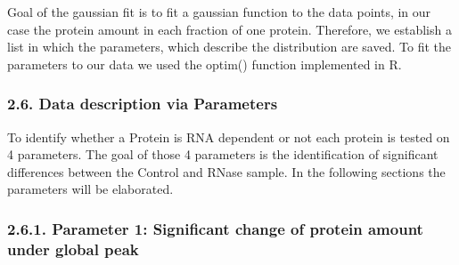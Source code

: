 \documentclass[
  12pt,
]{article}
\begin{document}
Goal of the gaussian fit is to fit a gaussian function to the data
points, in our case the protein amount in each fraction of one protein.
Therefore, we establish a list in which the parameters, which describe
the distribution are saved. To fit the parameters to our data we used
the optim() function implemented in R.

\hypertarget{data-description-via-parameters}{%
\subsubsection{2.6. Data description via
Parameters}\label{data-description-via-parameters}}

\renewcommand{\section}{\titlespacing*{\section}{0pt}{0.3\baselineskip}{0.2\baselineskip}\section}

To identify whether a Protein is RNA dependent or not each protein is
tested on 4 parameters. The goal of those 4 parameters is the
identification of significant differences between the Control and RNase
sample. In the following sections the parameters will be elaborated.

\hypertarget{parameter-1-significant-change-of-protein-amount-under-global-peak}{%
\subsubsection{2.6.1. Parameter 1: Significant change of protein amount
under global
peak}\label{parameter-1-significant-change-of-protein-amount-under-global-peak}}

\renewcommand{\section}{\titlespacing*{\section}{0pt}{0.3\baselineskip}{0.2\baselineskip}\section}
\end{document}
